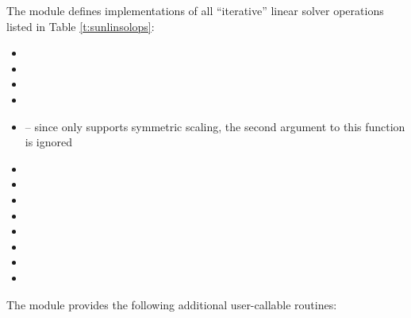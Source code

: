 \noindent The {\sunlinsolpcg} module defines implementations of all
``iterative'' linear solver operations listed in Table
\ref{t:sunlinsolops}:
\begin{itemize}
\item {}
\item {}
\item {}
\item {}
\item {} -- since {\pcg} only
  supports symmetric scaling, the second {\nvector} argument to this
  function is ignored
\item {}
\item {}
\item {}
\item {}
\item {}
\item {}
\item {}
\item {}
\end{itemize}
The module {\sunlinsolpcg} provides the following additional
user-callable routines: 
